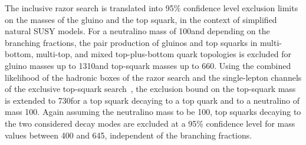 The inclusive razor search is translated into 95\% confidence level
exclusion limits on the masses of the gluino and the top squark, in the
context of simplified natural SUSY models.  For a neutralino mass
of 100\GeV and depending on the branching fractions, the pair
production of gluinos and top squarks in multi-bottom, multi-top, and
mixed top-plus-bottom quark topologies is excluded for gluino masses
up to 1310\GeV and top-squark masses up to 660\GeV.  Using the
combined likelihood of the hadronic boxes of the razor search and the
single-lepton channels of the exclusive top-squark
search~\cite{1LepMVA}, the exclusion bound on the top-squark mass is
extended to 730\GeV for a top squark decaying to a top quark and to a
neutralino of mass 100\GeV.  Again assuming the neutralino mass to be 100\GeV, top
squarks decaying to the two considered decay modes are excluded at a
95\% confidence level for mass values between 400 and 645\GeV,
independent of the branching fractions.
